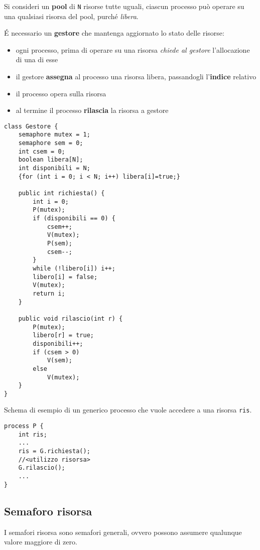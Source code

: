 Si consideri un \textbf{pool} di \texttt{N} risorse tutte uguali, ciascun processo può operare su una qualsiasi risorsa del pool, purché \textit{libera}.

É necessario un \textbf{gestore} che mantenga aggiornato lo stato delle risorse:
\begin{itemize}
    \item ogni processo, prima di operare su una risorsa \textit{chiede al gestore} l'allocazione di una di esse
    \item il gestore \textbf{assegna} al processo una risorsa libera, passandogli l'\textbf{indice} relativo
    \item il processo opera sulla risorsa
    \item al termine il processo \textbf{rilascia} la risorsa a gestore
\end{itemize}

\begin{verbatim}
class Gestore {
    semaphore mutex = 1;
    semaphore sem = 0;
    int csem = 0;
    boolean libera[N];
    int disponibili = N;
    {for (int i = 0; i < N; i++) libera[i]=true;}
    
    public int richiesta() {
        int i = 0;
        P(mutex);
        if (disponibili == 0) {
            csem++;
            V(mutex);
            P(sem);
            csem--;
        }
        while (!libero[i]) i++;
        libero[i] = false;
        V(mutex);
        return i;
    }

    public void rilascio(int r) {
        P(mutex);
        libero[r] = true;
        disponibili++;
        if (csem > 0) 
            V(sem);
        else 
            V(mutex);
    }
}
\end{verbatim}

Schema di esempio di un generico processo che vuole accedere a una risorsa \texttt{ris}.

\begin{verbatim}
process P {
    int ris;
    ...
    ris = G.richiesta();
    //<utilizzo risorsa>
    G.rilascio();
    ...
}
\end{verbatim}

\subsection{Semaforo risorsa}
I semafori risorsa sono semafori generali, ovvero possono assumere qualunque valore maggiore di zero.

